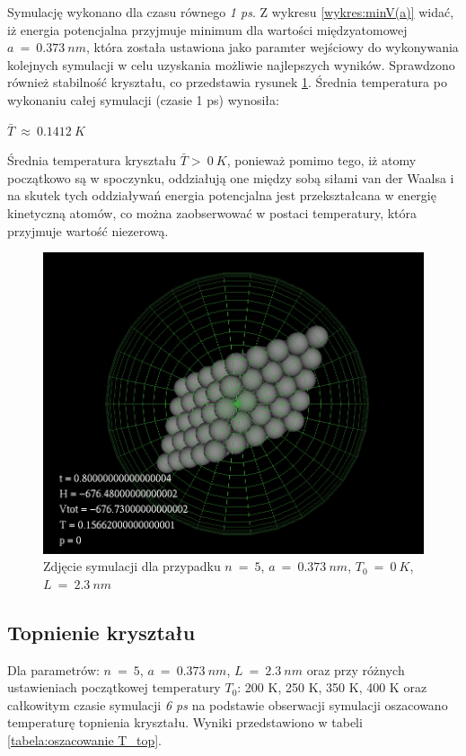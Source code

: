 \documentclass[10]{article}
\begin{document}
Symulację wykonano dla czasu równego \textit{1 ps}. Z wykresu \ref{wykres:minV(a)} widać, iż energia potencjalna przyjmuje minimum dla wartości międzyatomowej \textbf{$a~=~0.373~nm$}, która została ustawiona jako paramter wejściowy do wykonywania kolejnych symulacji w celu uzyskania możliwie najlepszych wyników. Sprawdzono również stabilność kryształu, co przedstawia rysunek \ref{wykres:stabilny}. Średnia temperatura po wykonaniu całej symulacji (czasie 1 ps) wynosiła:\\
\begin{center}
$\bar{T}~\approx~0.1412~ K$
\end{center}
Średnia temperatura kryształu $\bar{T} >~0~K$, ponieważ pomimo tego, iż atomy początkowo są w spoczynku, oddziałują one między sobą siłami van der Waalsa i na skutek tych oddziaływań energia potencjalna jest przekształcana w energię kinetyczną atomów, co można zaobserwować w postaci temperatury, która przyjmuje wartość niezerową.
\begin{figure}[H]
\begin{center}
\includegraphics[scale=0.4]{stabilny_T0.png}
\caption{Zdjęcie symulacji dla przypadku $n~=~5$, $a~=~0.373~ nm$, $T_0 ~=~0~ K$, $L~=~2.3~nm$} \label{wykres:stabilny}
\end{center}
\end{figure}

\subsection{Topnienie kryształu}
Dla parametrów: $n~=~5$, $a~=~0.373~ nm$, $L~=~2.3~nm$
oraz przy różnych ustawieniach początkowej temperatury $T_0$: 200 K, 250 K, 350 K, 400 K oraz całkowitym czasie symulacji \textit{6 ps} na podstawie obserwacji symulacji oszacowano temperaturę topnienia kryształu. Wyniki przedstawiono w tabeli \ref{tabela:oszacowanie T_top}.
\end{document}
